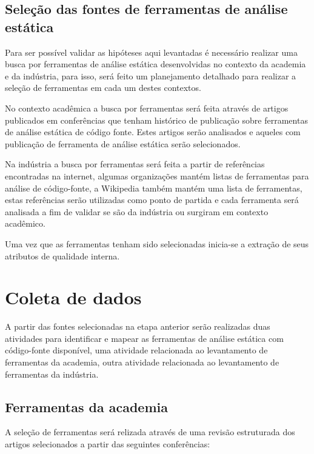 \documentclass[qual, classic, a4paper]{ufbathesis}
\begin{document}
\subsection{Seleção das fontes de ferramentas de análise estática}\label{levantamento}

Para ser possível validar as hipóteses aqui levantadas é necessário realizar
uma busca por ferramentas de análise estática desenvolvidas no contexto da
academia e da indústria, para isso, será feito um planejamento detalhado para
realizar a seleção de ferramentas em cada um destes contextos.

No contexto acadêmica a busca por ferramentas será feita
através de artigos publicados em conferências que tenham histórico de
publicação sobre ferramentas de análise estática de código fonte. Estes
artigos serão analisados e aqueles com publicação de ferramenta de análise
estática serão selecionados.

Na indústria a busca por ferramentas será feita a partir
de referências encontradas na internet, algumas organizações mantém listas de
ferramentas para análise de código-fonte, a Wikipedia também mantém uma lista
de ferramentas, estas referências serão utilizadas como ponto de partida e
cada ferramenta será analisada a fim de validar se são da indústria ou
surgiram em contexto acadêmico.

Uma vez que as ferramentas tenham sido selecionadas inicia-se a extração de
seus atributos de qualidade interna.

\section{Coleta de dados}

A partir das fontes selecionadas na etapa anterior serão realizadas duas
atividades para identificar e mapear as ferramentas de análise estática com
código-fonte disponível, uma atividade relacionada ao levantamento de
ferramentas da academia, outra atividade relacionada ao levantamento de
ferramentas da indústria.

\subsection{Ferramentas da academia}

A seleção de ferramentas será relizada através de uma revisão estruturada dos
artigos selecionados a partir das seguintes conferências:
\end{document}
